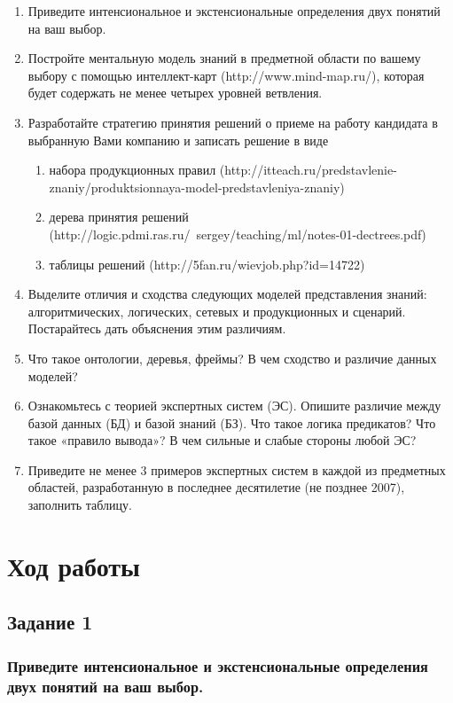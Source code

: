 \documentclass[14pt,a4paper,report]{report}
\begin{document}
\begin{enumerate}
\item Приведите интенсиональное и экстенсиональные определения двух понятий на ваш выбор.
\item Постройте ментальную модель знаний в предметной области по вашему выбору с помощью
интеллект-карт (http://www.mind-map.ru/), которая будет содержать не менее четырех уровней
ветвления.
\item Разработайте стратегию принятия решений о приеме на работу кандидата в выбранную Вами
компанию и записать решение в виде
\begin{enumerate}
\item набора продукционных правил (http://itteach.ru/predstavlenie-znaniy/produktsionnaya-model-predstavleniya-znaniy)
\item дерева принятия решений (http://logic.pdmi.ras.ru/~sergey/teaching/ml/notes-01-dectrees.pdf)
\item таблицы решений (http://5fan.ru/wievjob.php?id=14722)
\end{enumerate}
\item Выделите отличия и сходства следующих моделей представления знаний: алгоритмических,
логических, сетевых и продукционных и сценарий. Постарайтесь дать объяснения этим различиям.
\item Что такое онтологии, деревья, фреймы? В чем сходство и различие данных моделей?
\item Ознакомьтесь с теорией экспертных систем (ЭС). Опишите различие между базой данных (БД) и
базой знаний (БЗ). Что такое логика предикатов? Что такое «правило вывода»? В чем сильные и
слабые стороны любой ЭС?
\item Приведите не менее 3 примеров экспертных систем в каждой из предметных областей,
разработанную в последнее десятилетие (не позднее 2007), заполнить таблицу.
\end{enumerate}

\clearpage

\section{Ход работы}

\subsection{Задание 1}

\subsubsection{Приведите интенсиональное и экстенсиональные определения двух понятий на ваш выбор.}
\end{document}
